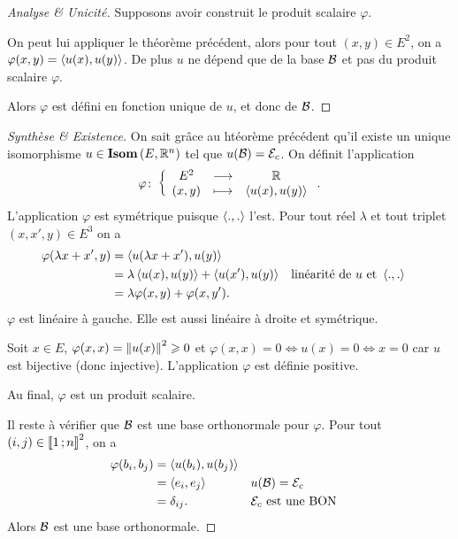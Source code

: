     \begin{proof}[Analyse \& Unicité]
      Supposons avoir construit le produit scalaire \(\varphi\).

      On peut lui appliquer le théorème précédent, alors pour tout \((x,y) \in E^2\), on a \(\varphi(x,y)=\left\langle{u(x)},{u(y)}\right\rangle\). De plus \(u\) ne dépend que de la base \(\mathcal{B}\) et pas du produit scalaire \(\varphi\).

      Alors \(\varphi\) est défini en fonction unique de \(u\), et donc de \(\mathcal{B}\).
    \end{proof}
    \begin{proof}[Synthèse \& Existence]
      On sait grâce au htéorème précédent qu'il existe un unique isomorphisme \(u \in \mathbf{Isom}\left(E,\mathbb{R}^n\right)\) tel que \(u(\mathcal{B})=\mathcal{E}_c\). On définit l'application
      \begin{equation}
        \varphi\colon \left\{\begin{array}{ccc} E^2 & \longrightarrow &\mathbb{R}\\ (x,y) & \longmapsto & \left\langle{u(x)},{u(y)}\right\rangle \end{array} \right..
      \end{equation}
      L'application \(\varphi\) est symétrique puisque \(\left\langle{.},{.}\right\rangle\) l'est. Pour tout réel \(\lambda\) et tout triplet \((x,x',y) \in E^3\) on a
      \begin{align}
        \varphi(\lambda x+x',y) &= \left\langle{u(\lambda x+x')},{u(y)}\right\rangle \\
                                &=\lambda \left\langle{u(x)},{u(y)}\right\rangle+ \left\langle{u(x')},{u(y)}\right\rangle && \text{linéarité de } u \text{~et~} \left\langle{.},{.}\right\rangle \\
                                &=\lambda \varphi(x,y)+ \varphi(x,y').
      \end{align}
      \(\varphi\) est linéaire à gauche. Elle est aussi linéaire à droite et symétrique.

      Soit \(x \in E\), \(\varphi(x,x)=\left\lVert u(x)\right\rVert^2 \geqslant 0\) et \(\varphi(x,x)=0 \iff u(x)=0 \iff x=0\) car \(u\) est bijective (donc injective). L'application \(\varphi\) est définie positive.

      Au final, \(\varphi\) est un produit scalaire.

      Il reste à vérifier que \(\mathcal{B}\) est une base orthonormale pour \(\varphi\). Pour tout \((i,j) \in \mathopen{\llbracket}1\mathclose{}\mathpunct{};n\mathclose{\rrbracket}^2\), on a
      \begin{align}
        \varphi(b_i,b_j) &= \left\langle{u(b_i)},{u(b_j)}\right\rangle \\
                         &= \left\langle{e_i},{e_j}\right\rangle && u(\mathcal{B})=\mathcal{E}_c\\
                         &=\delta_{ij}. && \mathcal{E}_c \text{~est une BON}
      \end{align}
      Alors \(\mathcal{B}\) est une base orthonormale.
    \end{proof}

